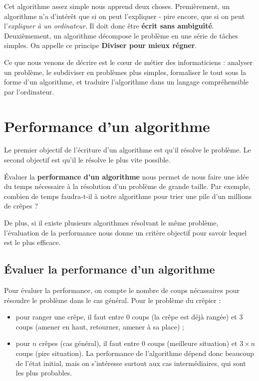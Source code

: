 \documentclass[a5paper,pagesize,DIV=14]{scrbook}
\begin{document}
Cet algorithme assez simple nous apprend deux choses. Premièrement, un algorithme n'a d'intérêt que si on peut l'expliquer - pire encore, que si on peut l'\textit{expliquer à un ordinateur}. Il doit donc être \textbf{écrit sans ambiguîté}. Deuxièmement, un algorithme décompose le problème en une série de tâches simples. On appelle ce principe \textbf{\og Diviser pour mieux régner\fg}.

Ce que nous venons de décrire est le c\oe{}ur de métier des informaticiens : analyser un problème, le subdiviser en problèmes plus simples, formaliser le tout sous la forme d'un algorithme, et traduire l'algorithme dans un langage compréhensible par l'ordinateur.

\section*{Performance d'un algorithme}

Le premier objectif de l'écriture d'un algorithme est qu'il résolve le problème. Le second objectif est qu'il le résolve le plus vite possible. 

Évaluer la \textbf{performance d'un algorithme} nous permet de nous faire une idée du temps nécessaire à la résolution d'un problème de grande taille. Par exemple, combien de temps faudra-t-il à notre algorithme pour trier une pile d'un millions de crêpes ?

De plus, si il existe plusieurs algorithmes résolvant le même problème, l'évaluation de la performance nous donne un critère objectif pour savoir lequel est le plus efficace.

\subsection*{Évaluer la performance d'un algorithme}

Pour évaluer la performance, on compte le nombre de \og coups \fg nécassaires pour résoudre le problème dans le cas général. Pour le problème du crêpier :

\begin{itemize}
  \item pour ranger une crêpe, il faut entre $0$ coups (la crêpe est déjà rangée) et $3$ coups (amener en haut, retourner, amener à sa place) ;
  \item pour $n$ crêpes (cas général), il faut entre $0$ coups (meilleure situation) et $3 \times n$ coups (pire situation). La performance de l'algorithme dépend donc beaucoup de l'état initial, mais on s'intéresse surtout aux cas intermédiaires, qui sont les plus probables.
\end{itemize}
\end{document}
